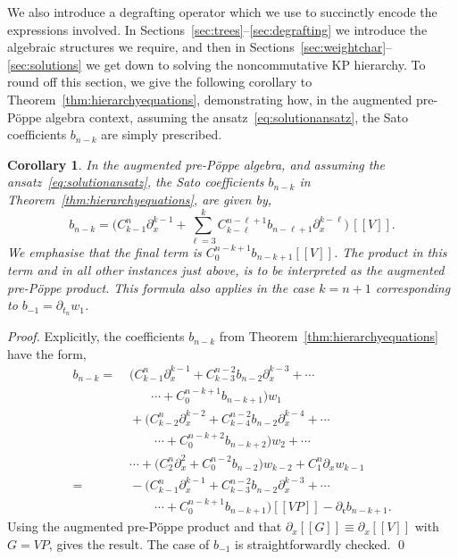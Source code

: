 \documentclass[5p,twocolumn]{elsarticle}
\newcommand*{\pa}{{\partial}}
\newcommand*{\lb}{[\![}
\newcommand*{\rb}{]\!]}
\newcommand*{\rl}{\mathfrak r}
\newtheorem{corollary}[theorem]{Corollary}
\begin{document}
We also introduce a degrafting operator which we use to succinctly encode the expressions involved.
In Sections~\ref{sec:trees}--\ref{sec:degrafting} we introduce the algebraic structures we require, and then in Sections~\ref{sec:weightchar}--\ref{sec:solutions} we get down to solving the noncommutative KP hierarchy.
To round off this section, we give the following corollary to Theorem~\ref{thm:hierarchyequations}, demonstrating how, in the augmented pre-P\"oppe algebra context, assuming the ansatz~\eqref{eq:solutionansatz},  
the Sato coefficients $b_{n-k}$ are simply prescribed.
%
\begin{corollary}\label{cor:hierarchyequations}
  In the augmented pre-P\"oppe algebra, and assuming the ansatz~\eqref{eq:solutionansatz}, the Sato coefficients $b_{n-k}$ in Theorem~\ref{thm:hierarchyequations}, are given by,
  \begin{equation*}
    b_{n-k}=\biggl(C_{k-1}^n\pa_x^{k-1}+\sum_{\ell=3}^{k}C_{k-\ell}^{n-\ell+1}b_{n-\ell+1}\pa_x^{k-\ell}\biggr)\,\lb V\rb.
  \end{equation*}
  We emphasise that the final term is $C_0^{n-k+1}b_{n-k+1}\lb V\rb$. 
  The product in this term and in all other instances just above, is to be interpreted as the augmented pre-P\"oppe product.
  This formula also applies in the case $k=n+1$ corresponding to $b_{-1}=\pa_{t_n}w_1$.
\end{corollary}
%
\begin{proof}
  Explicitly, the coefficients $b_{n-k}$ from Theorem~\ref{thm:hierarchyequations} have the form,
  \begin{align*}
    b_{n-k}=&\;\bigl(C_{k-1}^n\pa_x^{k-1}+C_{k-3}^{n-2}b_{n-2}\pa_x^{k-3}+\cdots\\
           &\qquad\cdots+C_0^{n-k+1}b_{n-k+1}\bigr)w_1\\
           &\;+\bigl(C_{k-2}^n\pa_x^{k-2}+C_{k-4}^{n-2}b_{n-2}\pa_x^{k-4}+\cdots\\
           &\;\qquad\cdots+C_0^{n-k+2}b_{n-k+2}\bigr)w_2+\cdots\\
           &\;\cdots+\bigl(C_2^n\pa_x^2+C_0^{n-2}b_{n-2}\bigr)w_{k-2}+C_1^n\pa_x w_{k-1}\\
          =&\;-\bigl(C_{k-1}^n\pa_x^{k-1}+C_{k-3}^{n-2}b_{n-2}\pa_x^{k-3}+\cdots\\
           &\;\qquad\cdots+C_0^{n-k+1}b_{n-k+1}\bigr)\lb VP\rb-\pa_{\rl}b_{n-k+1}.
  \end{align*}
  Using the augmented pre-P\"oppe product and that $\pa_x\lb G\rb\equiv\pa_{x}\lb V\rb$ with $G=VP$, gives the result.
  The case of $b_{-1}$ is straightforwardly checked.
\qed
\end{proof}
\end{document}
